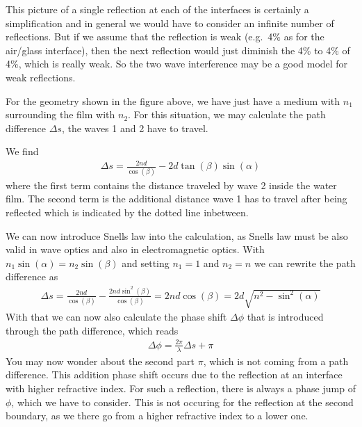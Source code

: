 \documentclass[letterpaper,10pt,english]{sphinxmanual}
\begin{document}
This picture of a single reflection at each of the interfaces is certainly a simplification and in general we would have to consider an infinite number of reflections. But if we assume that the reflection is weak (e.g. 4\% as for the air/glass interface), then the next reflection would just diminish the 4\% to 4\% of 4\%, which is really weak. So the two wave interference may be a good model for weak reflections.

For the geometry shown in the figure above, we have just have a medium with \(n_1\) surrounding the film with \(n_2\). For this situation, we may calculate the path difference \(\Delta s\), the waves 1 and 2 have to travel.

We find
\begin{equation*}
\begin{split}\Delta s=\frac{2nd}{\cos(\beta)}-2d\tan(\beta)\sin(\alpha)\end{split}
\end{equation*}
where the first term contains the distance traveled by wave 2 inside the water film. The second term is the additional distance wave 1 has to travel after being reflected which is indicated by the dotted line inbetween.

We can now introduce Snells law into the calculation, as Snells law must be also valid in wave optics and also in electromagnetic optics. With \(n_1\sin(\alpha)=n_2\sin(\beta)\) and setting \(n_1=1\) and \(n_2=n\) we can rewrite the path difference as
\begin{equation*}
\begin{split}\Delta s =\frac{2nd}{\cos(\beta)}-\frac{2nd\sin^2(\beta)}{\cos(\beta)}=2n d \cos(\beta)=2d\sqrt{n^2-\sin^2(\alpha)}\end{split}
\end{equation*}
With that we can now also calculate the phase shift \(\Delta \phi\) that is introduced through the path difference, which reads
\begin{equation*}
\begin{split}\Delta \phi=\frac{2\pi}{\lambda}\Delta s +\pi\end{split}
\end{equation*}
You may now wonder about the second part \(\pi\), which is not coming from a path difference. This addition phase shift occurs due to the reflection at an interface with higher refractive index. For such a reflection, there is always a phase jump of \(\phi\), which we have to consider. This is not occuring for the reflection at the second boundary, as we there go from a higher refractive index to a lower one.
\end{document}
